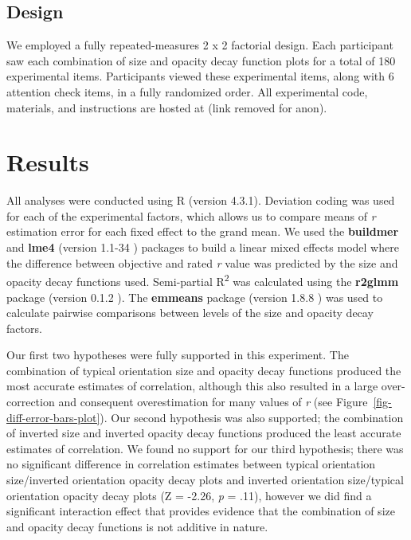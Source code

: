 \documentclass[sigconf]{acmart}
\begin{document}
\hypertarget{sec-design}{%
\subsection{Design}\label{sec-design}}

We employed a fully repeated-measures 2 x 2 factorial design. Each
participant saw each combination of size and opacity decay function
plots for a total of 180 experimental items. Participants viewed these
experimental items, along with 6 attention check items, in a fully
randomized order. All experimental code, materials, and instructions are
hosted at (link removed for anon).

\hypertarget{sec-results}{%
\section{Results}\label{sec-results}}

All analyses were conducted using R (version 4.3.1). Deviation coding
was used for each of the experimental factors, which allows us to
compare means of \emph{r} estimation error for each fixed effect to the
grand mean. We used the \textbf{buildmer} and \textbf{lme4} (version
1.1-34 \citep{lme4}) packages to build a linear mixed effects model
where the difference between objective and rated \emph{r} value was
predicted by the size and opacity decay functions used. Semi-partial
R\textsuperscript{2} was calculated using the \textbf{r2glmm} package
(version 0.1.2 \citep{r2glmm}). The \textbf{emmeans} package (version
1.8.8 \citep{emmeans}) was used to calculate pairwise comparisons
between levels of the size and opacity decay factors.

Our first two hypotheses were fully supported in this experiment. The
combination of typical orientation size and opacity decay functions
produced the most accurate estimates of correlation, although this also
resulted in a large over-correction and consequent overestimation for
many values of \emph{r} (see Figure~\ref{fig-diff-error-bars-plot}). Our
second hypothesis was also supported; the combination of inverted size
and inverted opacity decay functions produced the least accurate
estimates of correlation. We found no support for our third hypothesis;
there was no significant difference in correlation estimates between
typical orientation size/inverted orientation opacity decay plots and
inverted orientation size/typical orientation opacity decay plots (Z =
-2.26, \emph{p} = .11), however we did find a significant interaction
effect that provides evidence that the combination of size and opacity
decay functions is not additive in nature.
\end{document}

